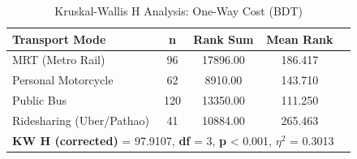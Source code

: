 \begin{table}[htbp]
\centering
\caption{Kruskal-Wallis H Analysis: One-Way Cost (BDT)}
\label{tab:analysis_01_one_way_cost}
\begin{tabular}{lcccc}
\hline
\textbf{Transport Mode} & \textbf{n} & \textbf{Rank Sum} & \textbf{Mean Rank} \\
\hline
MRT (Metro Rail) & 96 & 17896.00 & 186.417 \\
Personal Motorcycle & 62 & 8910.00 & 143.710 \\
Public Bus & 120 & 13350.00 & 111.250 \\
Ridesharing (Uber/Pathao) & 41 & 10884.00 & 265.463 \\
\hline
\multicolumn{4}{l}{\textbf{KW H (corrected)} = 97.9107, \textbf{df} = 3, \textbf{p} < 0.001, \textbf{$\eta^2$} = 0.3013} \\
\hline
\end{tabular}
\end{table}
